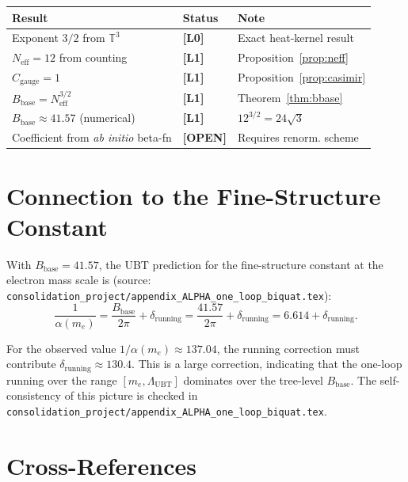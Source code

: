 \documentclass[11pt,a4paper]{article}
\newcommand{\Lzero}{\textbf{[L0]}}
\newcommand{\Lone}{\textbf{[L1]}}
\newcommand{\OPEN}{\textbf{[OPEN]}}
\begin{document}
\begin{center}
\begin{tabular}{lll}
\hline
Result & Status & Note \\
\hline
Exponent $3/2$ from $\mathbb{T}^3$ & \Lzero & Exact heat-kernel result \\
$N_{\mathrm{eff}} = 12$ from counting & \Lone & Proposition~\ref{prop:neff} \\
$C_{\mathrm{gauge}} = 1$ & \Lone & Proposition~\ref{prop:casimir} \\
$B_{\mathrm{base}} = N_{\mathrm{eff}}^{3/2}$ & \Lone & Theorem~\ref{thm:bbase} \\
$B_{\mathrm{base}} \approx 41.57$ (numerical) & \Lone & $12^{3/2} = 24\sqrt{3}$ \\
Coefficient from \emph{ab initio} beta-fn & \OPEN & Requires renorm. scheme \\
\hline
\end{tabular}
\end{center}

\section{Connection to the Fine-Structure Constant}
\label{sec:alpha}

With $B_{\mathrm{base}} = 41.57$, the UBT prediction for the
fine-structure constant at the electron mass scale is (source:
\texttt{consolidation\_project/appendix\_ALPHA\_one\_loop\_biquat.tex}):
\begin{equation}
\label{eq:alpha_prediction}
  \frac{1}{\alpha(m_e)}
  = \frac{B_{\mathrm{base}}}{2\pi}
  + \delta_{\mathrm{running}}
  = \frac{41.57}{2\pi} + \delta_{\mathrm{running}}
  = 6.614 + \delta_{\mathrm{running}}.
\end{equation}

For the observed value $1/\alpha(m_e)\approx 137.04$, the running correction
must contribute $\delta_{\mathrm{running}}\approx 130.4$.  This is a large
correction, indicating that the one-loop running over the range
$[m_e, \Lambda_{\mathrm{UBT}}]$ dominates over the tree-level $B_{\mathrm{base}}$.
The self-consistency of this picture is checked in
\texttt{consolidation\_project/appendix\_ALPHA\_one\_loop\_biquat.tex}.

\section{Cross-References}
\label{sec:xref}
\end{document}
